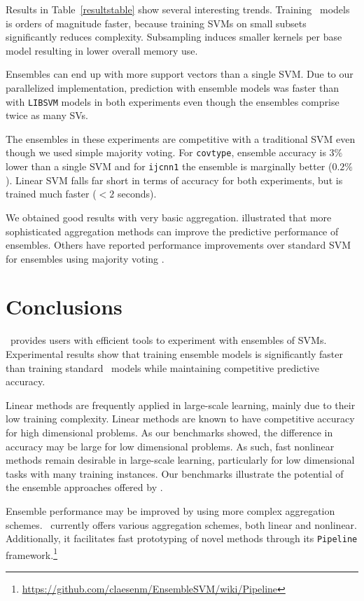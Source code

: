 {\noindent}Results in Table~\ref{resultstable} show several interesting trends. Training \esvm\ models is orders of magnitude faster,
because training SVMs on small subsets significantly reduces complexity. Subsampling induces smaller kernels per base model resulting in lower overall memory use.

Ensembles can end up with more support vectors than a single SVM. Due to our parallelized implementation, prediction with ensemble models was faster than with \texttt{LIBSVM} models in both experiments even though the ensembles comprise twice as many SVs.

The ensembles in these experiments are competitive with a traditional SVM even though we used simple majority voting. For \texttt{covtype}, ensemble accuracy is $3\%$ lower than a single SVM and for \texttt{ijcnn1} the ensemble is marginally better ($0.2\%$). Linear SVM falls far short in terms of accuracy for both experiments, but is trained much faster ($< 2$ seconds).

We obtained good results with very basic aggregation. \citet{Collobert02} illustrated that more sophisticated aggregation methods can improve the predictive performance of ensembles. Others have reported performance improvements over standard SVM for
ensembles using majority voting \citep{Valentini03lowbias,Wang20096466}.
 
\section{Conclusions}
\esvm\ provides users with efficient tools to experiment with ensembles of
SVMs. Experimental results show that training ensemble models is significantly
faster than training standard \libsvm\ models while maintaining competitive predictive accuracy.

Linear methods are frequently applied in large-scale learning, mainly due to their low training complexity. Linear methods are known to have competitive accuracy for high dimensional problems. As our benchmarks showed, the difference in accuracy may be large for low dimensional problems. As such, fast nonlinear methods remain desirable in large-scale learning, particularly for low dimensional tasks with many training instances. Our benchmarks illustrate the potential of the ensemble approaches offered by \esvm.

Ensemble performance may be improved by using more complex aggregation schemes. \esvm\ currently offers various aggregation schemes, both linear and nonlinear. Additionally, it facilitates fast prototyping of novel methods through its \texttt{Pipeline} framework.\footnote{\url{https://github.com/claesenm/EnsembleSVM/wiki/Pipeline}}

